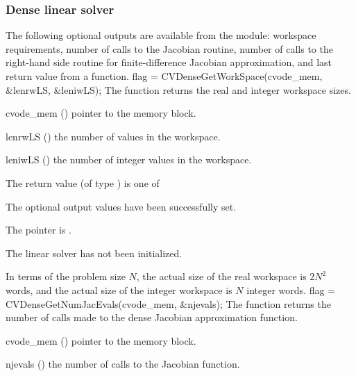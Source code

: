 \subsubsection{Dense linear solver}\label{sss:optout_dense}
The following optional outputs are available from the {\cvdense} module:
workspace requirements, number of calls to the Jacobian routine, number of 
calls to the right-hand side routine for finite-difference Jacobian approximation,
and last return value from a {\cvdense} function.
{
  flag = CVDenseGetWorkSpace(cvode\_mem, \&lenrwLS, \&leniwLS);
}
{
  The function  returns the
  {\cvdense} real and integer workspace sizes.
}
{
  \begin{args}
  \item[cvode\_mem] ()
    pointer to the {\cvodes} memory block.
  \item[lenrwLS] ()
    the number of  values in the {\cvdense} workspace.
  \item[leniwLS] ()
    the number of integer values in the {\cvdense} workspace.
  \end{args}
}
{
  The return value  (of type ) is one of
  \begin{args}
  \item[\Id{CVDENSE\_SUCCESS}] 
    The optional output values have been successfully set.
  \item[\Id{CVDENSE\_MEM\_NULL}]
    The  pointer is .
  \item[\Id{CVDENSE\_LMEM\_NULL}]
    The {\cvdense} linear solver has not been initialized.
  \end{args}
}
{
  In terms of the problem size $N$, the actual size of the real workspace
  is $2N^2$  words, and the actual size of the integer workspace
  is $N$ integer words.
}
{
  flag = CVDenseGetNumJacEvals(cvode\_mem, \&njevals);
}
{
  The function  returns the
  number of calls made to the dense Jacobian approximation function.
}
{
  \begin{args}
  \item[cvode\_mem] ()
    pointer to the {\cvodes} memory block.
  \item[njevals] ()
    the number of calls to the Jacobian function.
  \end{args}
}
